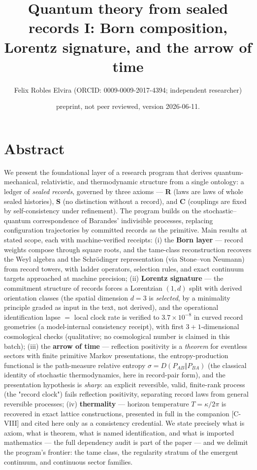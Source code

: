 \documentclass[11pt]{article}
\title{Quantum theory from sealed records I: Born composition, Lorentz signature, and the arrow of time}
\author{Felix Robles Elvira (ORCID: 0009-0009-2017-4394; independent researcher)}
\date{\small preprint, not peer reviewed, version 2026-06-11.}
\begin{document}
\maketitle

\section*{Abstract}
We present the foundational layer of a research program that derives quantum-mechanical, relativistic, and thermodynamic structure from a single ontology: a ledger of \emph{sealed records}, governed by three axioms — \textbf{R} (laws are laws of whole sealed histories), \textbf{S} (no distinction without a record), and \textbf{C} (couplings are fixed by self-consistency under refinement).  The program builds on the stochastic–quantum correspondence of Barandes' indivisible processes, replacing configuration trajectories by committed records as the primitive.  Main results at stated scope, each with machine-verified receipts: (i) the \textbf{Born layer} — record weights compose through square roots, and the tame-class reconstruction recovers the Weyl algebra and the Schrödinger representation (via Stone–von Neumann) from record towers, with ladder operators, selection rules, and exact continuum targets approached at machine precision; (ii) \textbf{Lorentz signature} — the commitment structure of records forces a Lorentzian $(1,d)$ split with derived orientation classes (the spatial dimension $d = 3$ is \emph{selected}, by a minimality principle graded as input in the text, not derived), and the operational identification lapse $=$ local clock rate is verified to $3.7\times 10^{-8}$ in curved record geometries (a model-internal consistency receipt), with first $3{+}1$-dimensional cosmological checks (qualitative; no cosmological number is claimed in this batch); (iii) the \textbf{arrow of time} — reflection positivity is a \emph{theorem} for eventless sectors with finite primitive Markov presentations, the entropy-production functional is the path-measure relative entropy $\sigma = D(P_{AB}\Vert P_{BA})$ (the classical identity of stochastic thermodynamics, here in record-pair form), and the presentation hypothesis is \emph{sharp}: an explicit reversible, valid, finite-rank process (the "record clock") fails reflection positivity, separating record laws from general reversible processes; (iv) \textbf{thermality} — horizon temperature $T = \kappa/2\pi$ is recovered in exact lattice constructions, presented in full in the companion [C-VIII] and cited here only as a consistency credential.  We state precisely what is axiom, what is theorem, what is named identification, and what is imported mathematics — the full dependency audit is part of the paper — and we delimit the program's frontier: the tame class, the regularity stratum of the emergent continuum, and continuous sector families.
\end{document}
